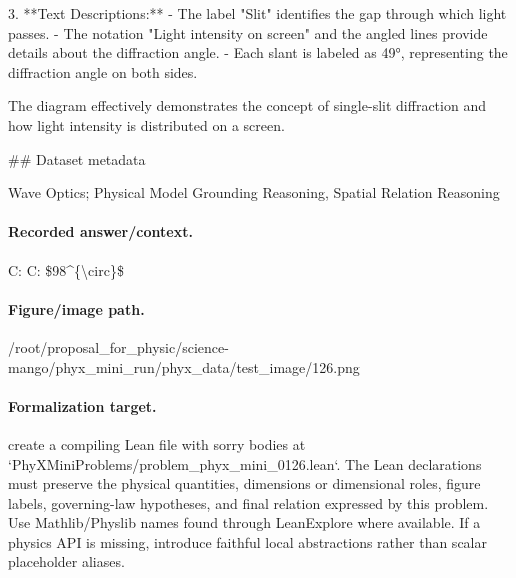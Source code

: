 3. **Text Descriptions:**
   - The label "Slit" identifies the gap through which light passes.
   - The notation "Light intensity on screen" and the angled lines provide details about the diffraction angle.
   - Each slant is labeled as 49°, representing the diffraction angle on both sides.

The diagram effectively demonstrates the concept of single-slit diffraction and how light intensity is distributed on a screen.

\#\# Dataset metadata

Wave Optics; Physical Model Grounding Reasoning, Spatial Relation Reasoning

\paragraph{Recorded answer/context.}
C: C: \$98\textasciicircum{}\{\textbackslash{}circ\}\$

\paragraph{Figure/image path.}
/root/proposal\_for\_physic/science-mango/phyx\_mini\_run/phyx\_data/test\_image/126.png

\paragraph{Formalization target.}
create a compiling Lean file with sorry bodies at `PhyXMiniProblems/problem\_phyx\_mini\_0126.lean`. The Lean declarations must preserve the physical quantities, dimensions or dimensional roles, figure labels, governing-law hypotheses, and final relation expressed by this problem.
Use Mathlib/Physlib names found through LeanExplore where available. If a physics API is missing, introduce faithful local abstractions rather than scalar placeholder aliases.

